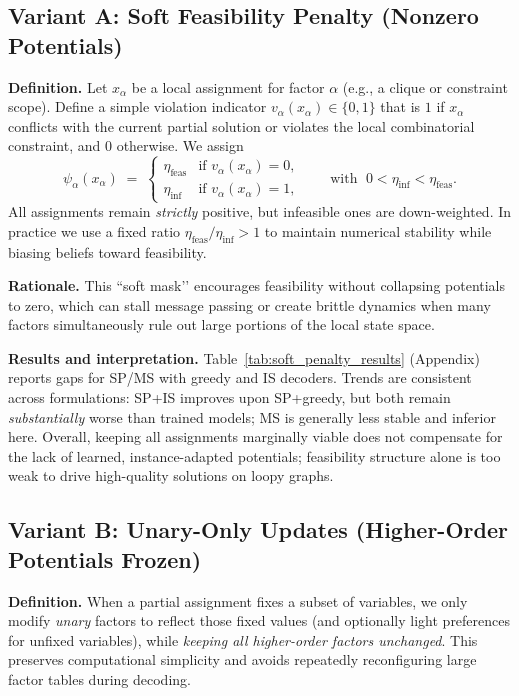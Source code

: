 \subsection{Variant A: Soft Feasibility Penalty (Nonzero Potentials)}
\label{app:soft_penalty}
\textbf{Definition.}
Let $x_\alpha$ be a local assignment for factor $\alpha$ (e.g., a clique or constraint scope). Define a simple violation indicator $v_\alpha(x_\alpha)\in\{0,1\}$ that is $1$ if $x_\alpha$ conflicts with the current partial solution or violates the local combinatorial constraint, and $0$ otherwise. We assign
\[
\psi_\alpha(x_\alpha) \;=\; 
\begin{cases}
\eta_{\text{feas}} & \text{if } v_\alpha(x_\alpha)=0,\\[2pt]
\eta_{\text{inf}}  & \text{if } v_\alpha(x_\alpha)=1,
\end{cases}
\qquad \text{with } \; 0<\eta_{\text{inf}}<\eta_{\text{feas}}.
\]
All assignments remain \emph{strictly} positive, but infeasible ones are down-weighted. In practice we use a fixed ratio $\eta_{\text{feas}}/\eta_{\text{inf}}>1$ to maintain numerical stability while biasing beliefs toward feasibility.

\textbf{Rationale.}
This “soft mask’’ encourages feasibility without collapsing potentials to zero, which can stall message passing or create brittle dynamics when many factors simultaneously rule out large portions of the local state space.

\textbf{Results and interpretation.}
Table~\ref{tab:soft_penalty_results} (Appendix) reports gaps for SP/MS with greedy and IS decoders. Trends are consistent across formulations: SP+IS improves upon SP+greedy, but both remain \emph{substantially} worse than trained models; MS is generally less stable and inferior here. Overall, keeping all assignments marginally viable does not compensate for the lack of learned, instance-adapted potentials; feasibility structure alone is too weak to drive high-quality solutions on loopy graphs.

\subsection{Variant B: Unary-Only Updates (Higher-Order Potentials Frozen)}
\label{app:unary_only}
\textbf{Definition.}
When a partial assignment fixes a subset of variables, we only modify \emph{unary} factors to reflect those fixed values (and optionally light preferences for unfixed variables), while \emph{keeping all higher-order factors unchanged}. This preserves computational simplicity and avoids repeatedly reconfiguring large factor tables during decoding.


